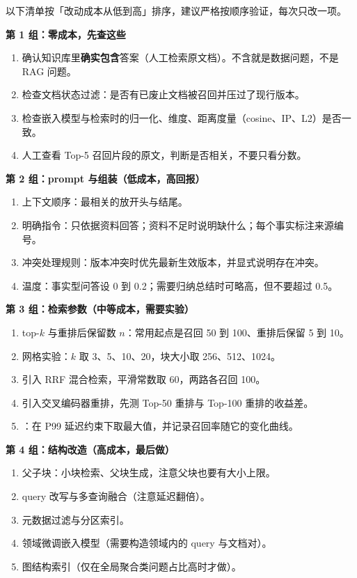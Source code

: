 \begin{toolbox}
以下清单按「改动成本从低到高」排序，建议严格按顺序验证，每次只改一项。

\textbf{第 1 组：零成本，先查这些}
\begin{enumerate}
  \item 确认知识库里\textbf{确实包含}答案（人工检索原文档）。不含就是数据问题，不是 RAG 问题。
  \item 检查文档状态过滤：是否有已废止文档被召回并压过了现行版本。
  \item 检查嵌入模型与检索时的归一化、维度、距离度量（cosine、IP、L2）是否一致。
  \item 人工查看 Top-5 召回片段的原文，判断是否相关，不要只看分数。
\end{enumerate}

\textbf{第 2 组：prompt 与组装（低成本，高回报）}
\begin{enumerate}
  \item 上下文顺序：最相关的放开头与结尾。
  \item 明确指令：只依据资料回答；资料不足时说明缺什么；每个事实标注来源编号。
  \item 冲突处理规则：版本冲突时优先最新生效版本，并显式说明存在冲突。
  \item 温度：事实型问答设 0 到 0.2；需要归纳总结时可略高，但不要超过 0.5。
\end{enumerate}

\textbf{第 3 组：检索参数（中等成本，需要实验）}
\begin{enumerate}
  \item top-$k$ 与重排后保留数 $n$：常用起点是召回 50 到 100、重排后保留 5 到 10。
  \item 网格实验：$k$ 取 3、5、10、20，块大小取 256、512、1024。
  \item 引入 RRF 混合检索，平滑常数取 60，两路各召回 100。
  \item 引入交叉编码器重排，先测 Top-50 重排与 Top-100 重排的收益差。
  \item {}：在 P99 延迟约束下取最大值，并记录召回率随它的变化曲线。
\end{enumerate}

\textbf{第 4 组：结构改造（高成本，最后做）}
\begin{enumerate}
  \item 父子块：小块检索、父块生成，注意父块也要有大小上限。
  \item query 改写与多查询融合（注意延迟翻倍）。
  \item 元数据过滤与分区索引。
  \item 领域微调嵌入模型（需要构造领域内的 query 与文档对）。
  \item 图结构索引（仅在全局聚合类问题占比高时才做）。
\end{enumerate}
\end{toolbox}


